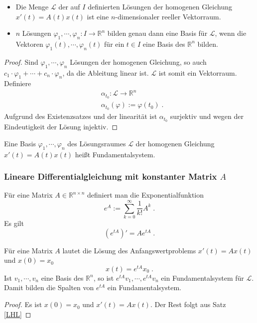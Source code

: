\begin{Satz}
\label{LHL}
\hfill
\begin{itemize}
\item Die Menge $\mathcal{L}$ der auf $I$ definierten Lösungen der homogenen Gleichung $x'(t) = A(t)x(t)$ ist eine $n$-dimensionaler reeller Vektorraum.
\item $n$ Lösungen $\varphi_1, \cdots, \varphi_n : I \to \mathbb{R}^n$ bilden genau dann eine Basis für $\mathcal{L}$, wenn die Vektoren $\varphi_1(t), \cdots, \varphi_n(t)$ für ein $t \in I$ eine Basis des $\mathbb{R}^n$ bilden.
\end{itemize}
\end{Satz}
\begin{proof}
Sind  $\varphi_1, \cdots, \varphi_n$ Lösungen der homogenen Gleichung, so auch $ c_1 \cdot \varphi_1 + \cdots + c_n \cdot \varphi_n$, da die Ableitung linear ist.
$\mathcal{L}$ ist somit ein Vektorraum. Definiere 
\begin{align*}
& \alpha_{t_0} : \mathcal{L} \to \mathbb{R}^n \\
& \alpha_{t_0} (\varphi) := \varphi(t_0) \; .
\end{align*} 
Aufgrund des Existenzsatzes und der linearität ist $ \alpha_{t_0}$ surjektiv und wegen der Eindeutigkeit der Lösung injektiv.
\end{proof}

\begin{Definition}
Eine Basis  $\varphi_1, \cdots, \varphi_n$ des Lösungsraumes $\mathcal{L}$ der homogenen Gleichung $x'(t) = A(t)x(t)$ heißt Fundamentalsystem.
\end{Definition}

\subsubsection{Lineare Differentialgleichung mit konstanter Matrix $A$}

\begin{Definition}
Für eine Matrix $A \in \mathbb{R}^{n \times n}$ definiert man die Exponentialfunktion 
$$  e^{ A}  := \sum_{k= 0}^{\infty} \frac{1}{k!} A^k \; .$$
Es gilt  
$$  (e^{ tA})' = A e^{tA}  \; .$$
\end{Definition}


\begin{Satz}
Für eine Matrix $A$ lautet die Lösung des Anfangswertproblems $x'(t) = Ax(t)$ und $x(0) = x_0$
$$ x(t) = e^{tA} x_0 \;.$$ Ist $v_1, \cdots , v_n$ eine Basis des $\mathbb{R}^n$, so ist $e^{tA}v_1, \cdots , e^{tA}v_n$ ein Fundamentalsystem für $\mathcal{L}$. Damit bilden die Spalten von  $e^{tA}$ ein Fundamentalsystem.
\end{Satz}
\begin{proof}
Es ist $x(0) = x_0$ und $x'(t)= A x(t)$. Der Rest folgt aus Satz  \ref{LHL}
\end{proof}

